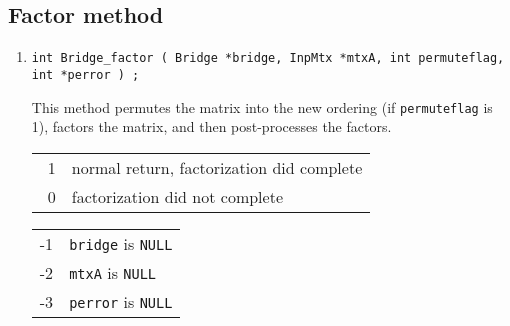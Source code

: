 \subsection{Factor method}
\label{subsection:Bridge:proto:factor}
\par
\begin{enumerate}
\item
\begin{verbatim}
int Bridge_factor ( Bridge *bridge, InpMtx *mtxA, int permuteflag, int *perror ) ;
\end{verbatim}
This method permutes the matrix into the new ordering (if
\texttt{permuteflag} is 1), factors the matrix, and then
post-processes the factors.
\par {}
\begin{center}
\begin{tabular}{ll}
~1 & normal return, factorization did complete \\
~0 & factorization did not complete \\
\end{tabular}
\begin{tabular}{ll}
-1 & \texttt{bridge} is \texttt{NULL} \\
-2 & \texttt{mtxA} is \texttt{NULL} \\
-3 & \texttt{perror} is \texttt{NULL} \\
\end{tabular}
\end{center}
\end{enumerate}
\par
